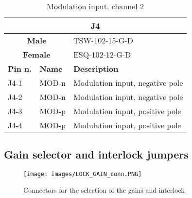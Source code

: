 \begin{table}[H]
    \begin{center}
        \begin{tabular}{
        |p{2cm}
        |>{\centering\arraybackslash}p{2cm}
        |>{\centering\arraybackslash}p{10cm}
        |  }
        \hline
            \multicolumn{3}{|c|}{\textbf{J4}}  \\
        \hline
        \hline
            \multicolumn{2}{|c|}{\textbf{Male}}  & TSW-102-15-G-D\\
        \hline
            \multicolumn{2}{|c|}{\textbf{Female}}  & ESQ-102-12-G-D\\
        \hline
        \hline 
            \textbf{Pin n.} & \textbf{Name} & \textbf{Description}\\
        \hline
            J4-1 & MOD-n & Modulation input, negative pole \\
        \hline
            J4-2 & MOD-n & Modulation input, negative pole \\
        \hline
            J4-3 & MOD-p & Modulation input, positive pole \\
        \hline
            J4-4 & MOD-p & Modulation input, positive pole \\
        \hline
        \end{tabular}
    \caption{Modulation input, channel 2}
    \end{center}
\end{table}



\subsection{Gain selector and interlock jumpers}

\begin{figure}[h]
    \centering
    \texttt{[image: images/LOCK\_GAIN\_conn.PNG]}
    \caption{Connectors for the selection of the gains and interlock}
    \label{lock_gain_conn}
\end{figure}


